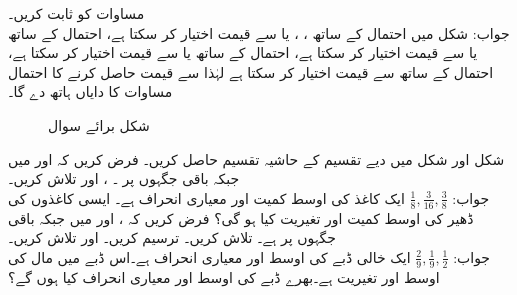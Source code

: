 \quad
مساوات  کو ثابت کریں۔\\
جواب:\quad
 شکل  میں   احتمال  کے ساتھ ، ،  یا  سے قیمت اختیار کر سکتا ہے، احتمال  کے ساتھ  یا  سے قیمت اختیار کر سکتا ہے، احتمال  کے ساتھ  یا  سے قیمت اختیار کر سکتا ہے، احتمال  کے ساتھ  سے قیمت اختیار کر سکتا ہے لہٰذا  سے قیمت حاصل کرنے کا احتمال مساوات  کا دایاں ہاتھ دے گا۔ 
\begin{figure}
\centering
{}
\caption{شکل برائے سوال }
\label{شکل_سوال_شماریات_ایک_سے_زائد_ثبوت_ب}
\end{figure}
\quad
شکل  اور شکل  میں دیے تقسیم کے حاشیہ تقسیم حاصل کریں۔
\quad
فرض کریں کہ  اور  میں  جبکہ باقی جگہوں پر ۔ ،  اور  تلاش کریں۔\\
جواب:\quad
$\tfrac{1}{8}, \tfrac{3}{16},\tfrac{3}{8}$
\quad
ایک کاغذ کی اوسط کمیت  اور معیاری انحراف  ہے۔ ایسی  کاغذوں کی ڈھیر کی اوسط کمیت اور تغیریت کیا ہو گی؟  
\quad
فرض کریں کہ ،  اور  میں  جبکہ باقی جگہوں پر  ہے۔ تلاش کریں۔  ترسیم کریں۔  اور   تلاش کریں۔\\
جواب:\quad
$\tfrac{2}{9}, \tfrac{1}{9},\tfrac{1}{2}$
\quad 
ایک خالی ڈبے کی اوسط  اور معیاری انحراف  ہے۔اس ڈبے میں مال کی اوسط  اور تغیریت  ہے۔بھرے ڈبے کی اوسط اور معیاری انحراف کیا ہوں گے؟ 
